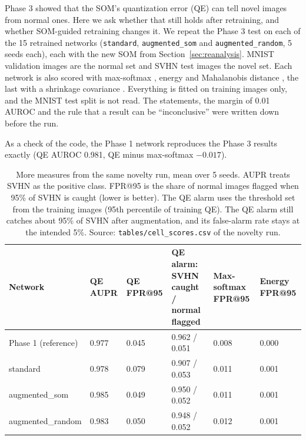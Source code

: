 \documentclass[11pt]{article}
\begin{document}
Phase 3 showed that the SOM's quantization error (QE) can tell novel images from normal ones. Here we ask whether that still holds after retraining, and whether SOM-guided retraining changes it. We repeat the Phase 3 test on each of the 15 retrained networks (\texttt{standard}, \texttt{augmented\_som} and \texttt{augmented\_random}, 5 seeds each), each with the new SOM from Section~\ref{sec:reanalysis}. MNIST validation images are the normal set and SVHN test images the novel set. Each network is also scored with max-softmax \parencite{hendrycks2017baseline}, energy \parencite{liu2020energy} and Mahalanobis distance \parencite{lee2018mahalanobis}, the last with a shrinkage covariance \parencite{ledoit2004wellconditioned}. Everything is fitted on training images only, and the MNIST test split is not read. The statements, the margin of 0.01 AUROC and the rule that a result can be ``inconclusive'' \parencite{walker2011noninferiority} were written down before the run.

As a check of the code, the Phase 1 network reproduces the Phase 3 results exactly (QE AUROC 0.981, QE minus max-softmax $-0.017$).



\begin{table}[H]
\centering
\renewcommand{\arraystretch}{1.1}
\footnotesize
{\setlength{\tabcolsep}{4pt}\begin{tabular}{|l|C{0.11\textwidth}|C{0.13\textwidth}|C{0.20\textwidth}|C{0.13\textwidth}|C{0.13\textwidth}|}
\hline
\textbf{Network} & \textbf{QE AUPR} & \textbf{QE FPR@95} & \textbf{QE alarm: SVHN caught / normal flagged} & \textbf{Max-softmax FPR@95} & \textbf{Energy FPR@95} \\ \hline
Phase 1 (reference) & 0.977 & 0.045 & 0.962 / 0.051 & 0.008 & 0.000 \\ \hline
standard & 0.978 & 0.079 & 0.907 / 0.053 & 0.011 & 0.001 \\ \hline
augmented\_som & 0.985 & 0.049 & 0.950 / 0.052 & 0.011 & 0.001 \\ \hline
augmented\_random & 0.983 & 0.050 & 0.948 / 0.052 & 0.012 & 0.001 \\ \hline
\end{tabular}}
\caption{More measures from the same novelty run, mean over 5 seeds. AUPR treats SVHN as the positive class. FPR@95 is the share of normal images flagged when 95\% of SVHN is caught (lower is better). The QE alarm uses the threshold set from the training images (95th percentile of training QE). The QE alarm still catches about 95\% of SVHN after augmentation, and its false-alarm rate stays at the intended 5\%. Source: \texttt{tables/cell\_scores.csv} of the novelty run.}
\label{tab:novelty_more}
\end{table}
\end{document}
